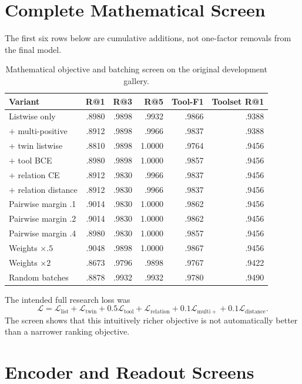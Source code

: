 \documentclass{article}
\begin{document}
\section{Complete Mathematical Screen}

The first six rows below are cumulative additions, not one-factor removals from the final model.

\begin{table}[h]
\caption{Mathematical objective and batching screen on the original development gallery.}
\centering
\scriptsize
\begin{tabular}{lrrrrr}
\toprule
Variant & R@1 & R@3 & R@5 & Tool-F1 & Toolset R@1 \\
\midrule
Listwise only & .8980 & .9898 & .9932 & .9866 & .9388 \\
$+$ multi-positive & .8912 & .9898 & .9966 & .9837 & .9388 \\
$+$ twin listwise & .8810 & .9898 & 1.0000 & .9764 & .9456 \\
$+$ tool BCE & .8980 & .9898 & 1.0000 & .9857 & .9456 \\
$+$ relation CE & .8912 & .9830 & .9966 & .9837 & .9456 \\
$+$ relation distance & .8912 & .9830 & .9966 & .9837 & .9456 \\
Pairwise margin .1 & .9014 & .9830 & 1.0000 & .9862 & .9456 \\
Pairwise margin .2 & .9014 & .9830 & 1.0000 & .9862 & .9456 \\
Pairwise margin .4 & .8980 & .9830 & 1.0000 & .9857 & .9456 \\
Weights $\times.5$ & .9048 & .9898 & 1.0000 & .9867 & .9456 \\
Weights $\times2$ & .8673 & .9796 & .9898 & .9767 & .9422 \\
Random batches & .8878 & .9932 & .9932 & .9780 & .9490 \\
\bottomrule
\end{tabular}
\end{table}

The intended full research loss was
\begin{equation}
\mathcal L=\mathcal L_{\mathrm{list}}+\mathcal L_{\mathrm{twin}}
+0.5\mathcal L_{\mathrm{tool}}+\mathcal L_{\mathrm{relation}}
+0.1\mathcal L_{\mathrm{multi+}}+0.1\mathcal L_{\mathrm{distance}}.
\end{equation}
The screen shows that this intuitively richer objective is not automatically better than a narrower ranking objective.

\section{Encoder and Readout Screens}
\end{document}
